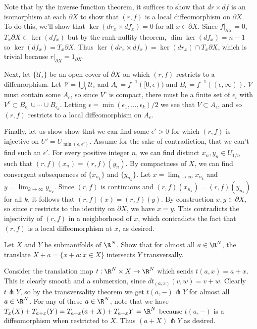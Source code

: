 \documentclass[11pt,letterpaper]{article}
\begin{document}
\begin{solution}
    \quad Note that by the inverse function theorem, it suffices to show that $dr\times df$ is an isomorphism at each $\partial X$ to show that $(r,f)$ is a local diffeomorphism on $\partial X$. To do this, we'll show that $\ker(dr_x\times df_x)=0$ for all $x\in \partial X$. Since $f|_{\partial X} = 0$, $T_x\partial X\subset \ker(df_x)$ but by the rank-nullity theorem, $\dim \ker(df_x) = n-1 $ so $\ker(df_x)=T_x\partial X$. Thus $\ker(dr_x\times df_x)=\ker(dr_x)\cap T_x\partial X$, which is trivial because $r|_{\partial X} = 1_{\partial X}$. 

    \medskip
    \quad Next, let $\{\mathcal{U}_i\}$ be an open cover of $\partial X$ on which $(r,f)$ restricts to a diffemorphism. Let $\mathcal{V}=\bigcup_i \mathcal{U}_i$ and $A_\epsilon = f^{-1}([0,\epsilon))$ and $B_\epsilon = f^{-1}((\epsilon,\infty))$. $\mathcal{V}$ must contain some $A_\epsilon$, so since $V^c$ is compact, there must be a finite set of $\epsilon_i$ with $V^c \subset B_{\epsilon_1}\cup\cdots\cup B_{\epsilon_k}$. Letting $\epsilon = \min(\epsilon_1,\ldots,\epsilon_k) / 2$ we see that $V\subset A_\epsilon$, and so $(r,f)$ restricts to a local diffeomorphism on $A_\epsilon$.

    \medskip
    \quad Finally, let us show show that we can find some $\epsilon' > 0$ for which $(r,f)$ is injective on $U' = U_{\min(\epsilon,\epsilon')}$. Assume for the sake of contradiction, that we can't find such an $\epsilon'$. For every positive integer $n$, we can find distinct $x_n, y_n \in U_{1/n}$ such that $(r,f)(x_n)=(r,f)(y_n)$. By compactness of $X$, we can find convergent subsequences of $\{x_{n_k}\}$ and $\{y_{n_k}\}$. Let $x=\lim_{k\to \infty}x_{n_k}$ and $y=\lim_{k\to\infty}y_{n_k}$. Since $(r,f)$ is continuous and $(r,f)(x_{n_k})=(r,f)(y_{n_k})$ for all $k$, it follows that $(r,f)(x)=(r,f)(y)$. By construction $x,y \in \partial X$, so since $r$ restricts to the identity on $\partial X$, we have $x = y$. This contradicts the injectivity of $(r,f)$ in a neighborhood of $x$, which contradicts the fact that $(r,f)$ is a local diffeomorphism at $x$, as desired.
\end{solution}

\begin{problem}
    Let $X$ and $Y$ be submanifolds of $\R^N$. Show that for almost all $a\in \R^N$, the translate $X+a=\{x+a : x\in X\}$ intersects $Y$ transversally.
\end{problem}

\begin{solution}
    \quad Consider the translation map $t : \R^N\times X \to \R^N$ which sends $t(a,x)=a+x$. This is clearly smooth and a submersion, since $dt_{(a,x)}(v,w)=v+w$. Clearly $t\pitchfork Y$, so by the transversality theorem we get $t(a,-)\pitchfork Y$ for almost all $a\in \R^N$. For any of these $a\in \R^N$, note that we have $T_x(X)+T_{a+x}(Y)=T_{a+x}(a+X)+T_{a+x}Y = \R^N$ because $t(a,-)$ is a diffeomorphism when restricted to $X$. Thus $(a+X)\pitchfork Y$ as desired.
\end{solution}
\end{document}
